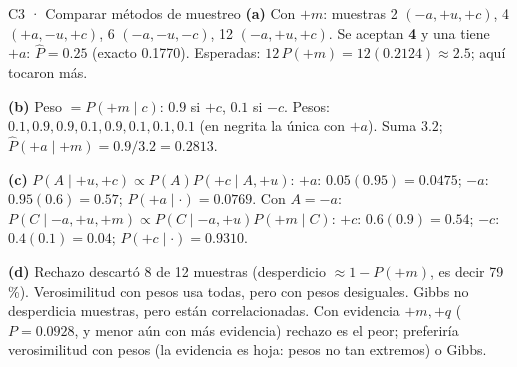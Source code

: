 \begin{solucion}{C3 · Comparar métodos de muestreo}
\textbf{(a)} Con $+m$: muestras 2 $(-a,+u,+c)$, 4 $(+a,-u,+c)$, 6 $(-a,-u,-c)$, 12 $(-a,+u,+c)$. Se aceptan \textbf{4} y una tiene $+a$: $\hat P=\mathbf{0.25}$
(exacto 0.1770). Esperadas: $12\,P(+m)=12(0.2124)\approx\mathbf{2.5}$; aquí tocaron más.

\textbf{(b)} Peso $=P(+m\mid c)$: $0.9$ si $+c$, $0.1$ si $-c$.
Pesos: $0.1,0.9,\mathbf{0.9},0.1,0.9,0.1,0.1,0.1$ (en negrita la única con $+a$). Suma $3.2$; $\hat P(+a\mid+m)=0.9/3.2=\mathbf{0.2813}$.

\textbf{(c)} $P(A\mid+u,+c)\propto P(A)P(+c\mid A,+u)$: $+a$: $0.05(0.95)=0.0475$; $-a$: $0.95(0.6)=0.57$; $P(+a\mid\cdot)=\mathbf{0.0769}$.
Con $A=-a$: $P(C\mid-a,+u,+m)\propto P(C\mid-a,+u)P(+m\mid C)$: $+c$: $0.6(0.9)=0.54$; $-c$: $0.4(0.1)=0.04$; $P(+c\mid\cdot)=\mathbf{0.9310}$.

\textbf{(d)} Rechazo descartó 8 de 12 muestras (desperdicio $\approx1-P(+m)$, es decir 79\,\%). Verosimilitud con pesos usa todas, pero con pesos desiguales.
Gibbs no desperdicia muestras, pero están correlacionadas. Con evidencia $+m,+q$ ($P=0.0928$, y menor aún con más evidencia) rechazo es el peor;
preferiría verosimilitud con pesos (la evidencia es hoja: pesos no tan extremos) o Gibbs.
\end{solucion}

